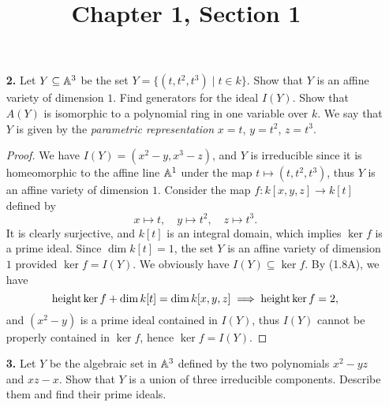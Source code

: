 \documentclass{article}
\title{Chapter 1, Section 1}
\begin{document}
\maketitle
\begin{enumerate} [label=\textbf{\arabic*.}, leftmargin=0em]

\item[\textbf{2.}] Let $Y \subseteq \mathbb{A}^3$ be the set $Y = \{(t, t^2, t^3) \mid t \in k \}$. Show that $Y$ is an affine variety of dimension $1$. Find generators for the ideal $I(Y)$. Show that $A(Y)$ is isomorphic to a polynomial ring in one variable over $k$. We say that $Y$ is given by the \textit{parametric representation} $x = t$, $y = t^2$, $z = t^3$.

\begin{proof}
    We have $I(Y) = (x^2 - y, x^3 - z)$, and $Y$ is irreducible since it is homeomorphic to the affine line $\mathbb{A}^1$ under the map $t \mapsto (t, t^2, t^3)$, thus $Y$ is an affine variety of dimension $1$. Consider the map $f : k[x, y, z] \to k[t]$ defined by
    \begin{equation*}
        x \mapsto t, \quad y \mapsto t^2, \quad z \mapsto t^3.
    \end{equation*}
    It is clearly surjective, and $k[t]$ is an integral domain, which implies $\ker{f}$ is a prime ideal. Since $\dim{k[t]} = 1$, the set $Y$ is an affine variety of dimension $1$ provided $\ker{f} = I(Y)$. We obviously have $I(Y) \subseteq \ker{f}$. By (1.8A), we have
    \begin{equation*}
        \operatorname{height}{\ker{f}} + \dim{k[t]} = \dim{k[x, y, z]} \implies \operatorname{height}{\ker{f}} = 2,
    \end{equation*}
    and $(x^2 - y)$ is a prime ideal contained in $I(Y)$, thus $I(Y)$ cannot be properly contained in $\ker{f}$, hence $\ker{f} = I(Y)$.
\end{proof}

\item[\textbf{3.}] Let $Y$ be the algebraic set in $\mathbb{A}^3$ defined by the two polynomials $x^2 - yz$ and $xz - x$. Show that $Y$ is a union of three irreducible components. Describe them and find their prime ideals.


\end{enumerate}
\end{document}
